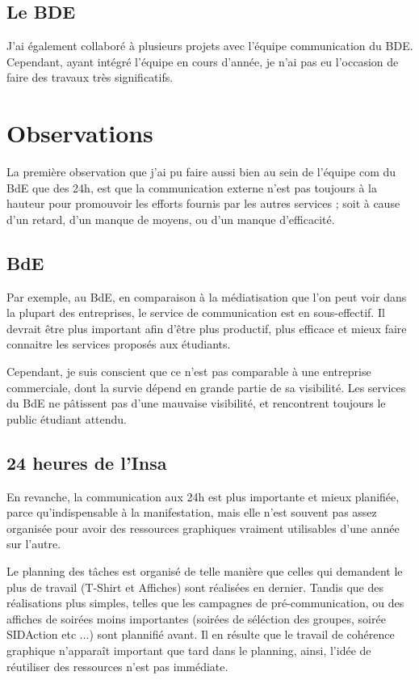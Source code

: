     \subsection{Le BDE}
    
        J'ai également collaboré à plusieurs projets avec l'équipe communication du BDE.
        Cependant, ayant intégré l'équipe en cours d'année, je n'ai pas eu l'occasion de faire des travaux très significatifs.

\section{Observations}

    La première observation que j'ai pu faire aussi bien au sein de l'équipe com du BdE que des 24h, est que la communication externe n'est pas toujours à la hauteur pour promouvoir les efforts fournis par les autres services ; soit à cause d'un retard, d'un manque de moyens, ou d'un manque d'efficacité.

    \subsection{BdE}

        Par exemple, au BdE, en comparaison à la médiatisation que l'on peut voir dans la plupart des entreprises, le service de communication est en sous-effectif. Il devrait être plus important afin d'être plus productif, plus efficace et mieux faire connaitre les services proposés aux étudiants.

        Cependant, je suis conscient que ce n'est pas comparable à une entreprise commerciale, dont la survie dépend en grande partie de sa visibilité.
        Les services du BdE ne pâtissent pas d'une mauvaise visibilité, et rencontrent toujours le public étudiant attendu.
    
    \subsection{24 heures de l'Insa}
        
        En revanche, la communication aux 24h est plus importante et mieux planifiée, parce qu'indispensable à la manifestation, mais elle n'est souvent pas assez organisée pour avoir des ressources graphiques vraiment utilisables d'une année sur l'autre.
        
        Le planning des tâches est organisé de telle manière que celles qui demandent le plus de travail (T-Shirt et Affiches) sont réalisées en dernier.
        Tandis que des réalisations plus simples, telles que les campagnes de pré-communication, ou des affiches de soirées moins importantes (soirées de séléction des groupes, soirée SIDAction etc ...) sont plannifié avant.
        Il en résulte que le travail de cohérence graphique n'apparaît important que tard dans le planning, ainsi, l'idée de réutiliser des ressources n'est pas immédiate.

